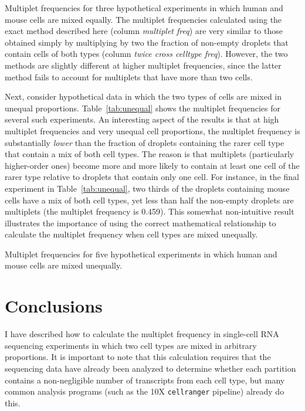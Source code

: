 \documentclass[fleqn,10pt]{wlpeerj} %
\begin{document}
\begin{table}[b]
\centering

\caption{\label{tab:equal}
Multiplet frequencies for three hypothetical experiments in which human and mouse cells are mixed equally.
The multiplet frequencies calculated using the exact method described here (column \emph{multiplet freq}) are very similar to those obtained simply by multiplying by two the fraction of non-empty droplets that contain cells of both types (column \emph{twice cross celltype freq}).
However, the two methods are slightly different at higher multiplet frequencies, since the latter method fails to account for multiplets that have more than two cells.}
\end{table}

Next, consider hypothetical data in which the two types of cells are mixed in unequal proportions.
Table~\ref{tab:unequal} shows the multiplet frequencies for several such experiments.
An interesting aspect of the results is that at high multiplet frequencies and very unequal cell proportions, the multiplet frequency is substantially \emph{lower} than the fraction of droplets containing the rarer cell type that contain a mix of both cell types.
The reason is that multiplets (particularly higher-order ones) become more and more likely to contain at least one cell of the rarer type relative to droplets that contain only one cell.
For instance, in the final experiment in Table~\ref{tab:unequal}, two thirds of the droplets containing mouse cells have a mix of both cell types, yet less than half the non-empty droplets are multiplets (the multiplet frequency is 0.459).
This somewhat non-intuitive result illustrates the importance of using the correct mathematical relationship to calculate the multiplet frequency when cell types are mixed unequally.

\begin{table}[t]
\centering

\caption{\label{tab:unequal}
Multiplet frequencies for five hypothetical experiments in which human and mouse cells are mixed unequally.}
\end{table}

\section*{Conclusions}
I have described how to calculate the multiplet frequency in single-cell RNA sequencing experiments in which two cell types are mixed in arbitrary proportions.
It is important to note that this calculation requires that the sequencing data have already been analyzed to determine whether each partition contains a non-negligible number of transcripts from each cell type, but many common analysis programs (such as the 10X \texttt{cellranger} pipeline) already do this.
\end{document}
